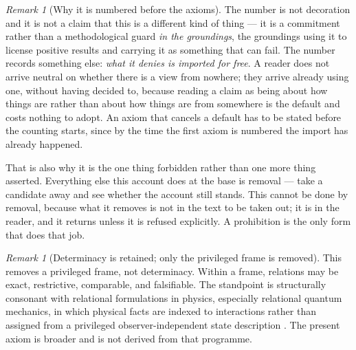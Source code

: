 \documentclass[11pt,a4paper]{article}
\theoremstyle{remark}\newtheorem{remark}[definition]{Remark}
\begin{document}
\begin{remark}[Why it is numbered before the axioms]\label{rem:why-minus-one}
The number is not decoration and it is not a claim that this is a different kind of thing --- it is a
commitment rather than a methodological guard \emph{in the groundings}, the groundings using it to license positive results
and carrying it as something that can fail. The number records something else: \emph{what it denies is imported for
free}. A reader does not arrive neutral on whether there is a view from nowhere; they arrive already
using one, without having decided to, because reading a claim as being about how things are rather
than about how things are from somewhere is the default and costs nothing to adopt. An axiom that
cancels a default has to be stated before the counting starts, since by the time the first axiom is
numbered the import has already happened.

That is also why it is the one thing forbidden rather than one more thing asserted. Everything else
this account does at the base is removal --- take a candidate away and see whether the account still
stands. This cannot be done by removal, because what it removes is not in the text to be taken out; it
is in the reader, and it returns unless it is refused explicitly. A prohibition is the only form that
does that job.
\end{remark}

\begin{remark}[Determinacy is retained; only the privileged frame is removed]\label{rem:determinacy-retained}
This removes a privileged frame, not determinacy. Within a frame, relations may be exact, restrictive, comparable, and falsifiable. The standpoint is structurally consonant with relational formulations in physics, especially relational quantum mechanics, in which physical facts are indexed to interactions rather than assigned from a privileged observer-independent state description \citep{rovelli1996}. The present axiom is broader and is not derived from that programme.
\end{remark}
\end{document}
